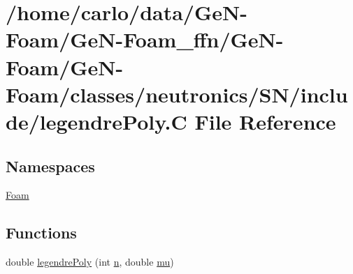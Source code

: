\hypertarget{legendrePoly_8C}{}\section{/home/carlo/data/\+Ge\+N-\/\+Foam/\+Ge\+N-\/\+Foam\+\_\+ffn/\+Ge\+N-\/\+Foam/\+Ge\+N-\/\+Foam/classes/neutronics/\+S\+N/include/legendre\+Poly.C File Reference}
\label{legendrePoly_8C}
\subsection*{Namespaces}
\begin{DoxyCompactItemize}
\item 
 \hyperlink{namespaceFoam}{Foam}
\end{DoxyCompactItemize}
\subsection*{Functions}
\begin{DoxyCompactItemize}
\item 
double \hyperlink{namespaceFoam_a09d3256445918e0d39ba72953ec62dfe}{legendre\+Poly} (int \hyperlink{solvePointKinetics_8H_adb283ac99a91b10be7420fca0134b932}{n}, double \hyperlink{EEqns__2p_8H_a5f502f41f7fa5ac3329b38810d2514f6}{mu})
\end{DoxyCompactItemize}
